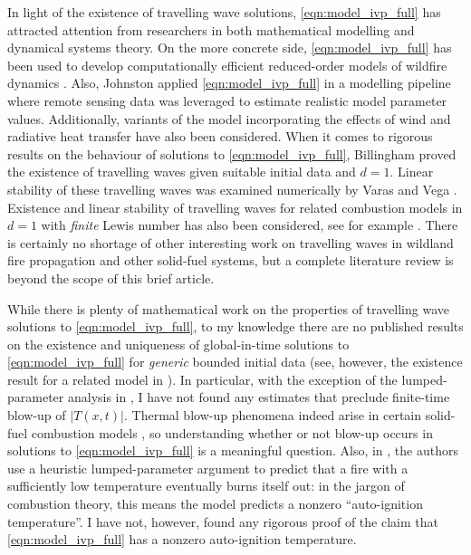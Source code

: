 \documentclass[twosided, 12pt]{article}
\numberwithin{equation}{section}
\theoremstyle{plain}
\begin{document}
\par In light of the existence of travelling wave solutions, \eqref{eqn:model_ivp_full} has attracted attention from researchers in both mathematical modelling and dynamical systems theory. On the more concrete side, \eqref{eqn:model_ivp_full} has been used to develop computationally efficient reduced-order models of wildfire dynamics \cite{BSU2021, LBGLL2016}. Also, Johnston \cite{Johnston2022} applied \eqref{eqn:model_ivp_full} in a modelling pipeline where remote sensing data was leveraged to estimate realistic model parameter values. Additionally, variants of the model incorporating the effects of wind \cite{BBH2009, Mandel_etal_2008} and radiative heat transfer \cite{AF2002, MPR2024, RNO2024, Weber1991} have also been considered. When it comes to rigorous results on the behaviour of solutions to \eqref{eqn:model_ivp_full}, Billingham \cite{Billingham2000} proved the existence of travelling waves given suitable initial data and $d=1$. Linear stability of these travelling waves was examined numerically by Varas and Vega \cite{VV2002}. Existence and linear stability of travelling waves for related combustion models in $d=1$ with \emph{finite} Lewis number has also been considered, see for example \cite{GJ2009, Razani2004}. There is certainly no shortage of other interesting work on travelling waves in wildland fire propagation and other solid-fuel systems, but a complete literature review is beyond the scope of this brief article. 
\par While there is plenty of mathematical work on the properties of travelling wave solutions to \eqref{eqn:model_ivp_full}, to my knowledge there are no published results on the existence and uniqueness of global-in-time solutions to \eqref{eqn:model_ivp_full} for \emph{generic} bounded initial data (see, however, the existence result for a related model in \cite[\S 4.4]{BE1989}). In particular, with the exception of the lumped-parameter analysis in \cite{RNO2024}, I have not found any estimates that preclude finite-time blow-up of $|T(x,t)|$. Thermal blow-up phenomena indeed arise in certain solid-fuel combustion models \cite[\S 3.2]{BE1989}%
, so understanding whether or not blow-up occurs in solutions to \eqref{eqn:model_ivp_full} is a meaningful question. Also, in \cite{Mandel_etal_2008}, the authors use a heuristic lumped-parameter argument to predict that a fire with a sufficiently low temperature eventually burns itself out: in the jargon of combustion theory, this means the model predicts a nonzero ``auto-ignition temperature''. I have not, however, found any rigorous proof of the claim that \eqref{eqn:model_ivp_full} has a nonzero auto-ignition temperature. 
\end{document}
